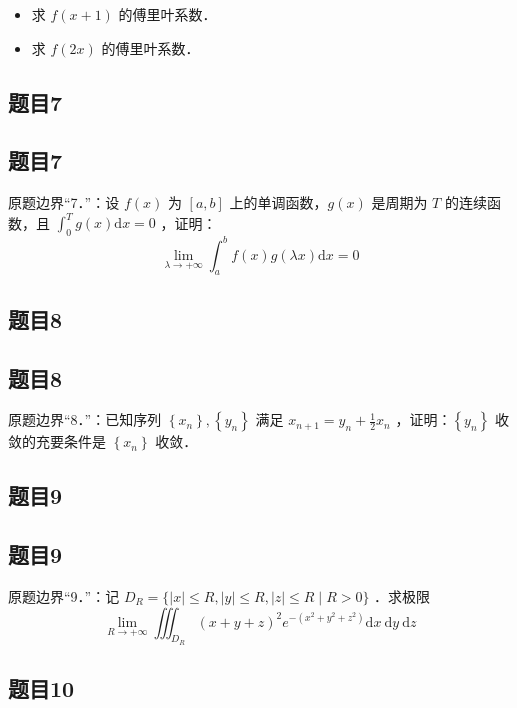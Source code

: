 \documentclass{article}
\begin{document}
\begin{itemize}
  \item[（1）] 求 \(f(x+1)\) 的傅里叶系数．
  \item[（2）] 求 \(f(2 x)\) 的傅里叶系数．
\end{itemize}

\begin{itemize}

\subsection{题目7}
\end{itemize}

\subsection{题目7}
原题边界“7．”：设 \(f(x)\) 为 \([a, b]\) 上的单调函数，\(g(x)\) 是周期为 \(T\) 的连续函数，且 \(\int_{0}^{T} g(x) \mathrm{d} x=0\) ，证明：
\[
\lim _{\lambda \rightarrow+\infty} \int_{a}^{b} f(x) g(\lambda x) \mathrm{d} x=0
\]

\subsection{题目8}

\subsection{题目8}
原题边界“8．”：已知序列 \(\left\{x_{n}\right\},\left\{y_{n}\right\}\) 满足 \(x_{n+1}=y_{n}+\frac{1}{2} x_{n}\) ，证明：\(\left\{y_{n}\right\}\) 收敛的充要条件是 \(\left\{x_{n}\right\}\) 收敛．




\subsection{题目9}

\subsection{题目9}
原题边界“9．”：记 \(D_{R}=\{|x| \leq R,|y| \leq R,|z| \leq R \mid R>0\}\) ．求极限
\[
\lim _{R \rightarrow+\infty} \iiint_{D_{R}}(x+y+z)^{2} e^{-\left(x^{2}+y^{2}+z^{2}\right)} \mathrm{d} x \mathrm{~d} y \mathrm{~d} z
\]

\subsection{题目10}
\end{document}
